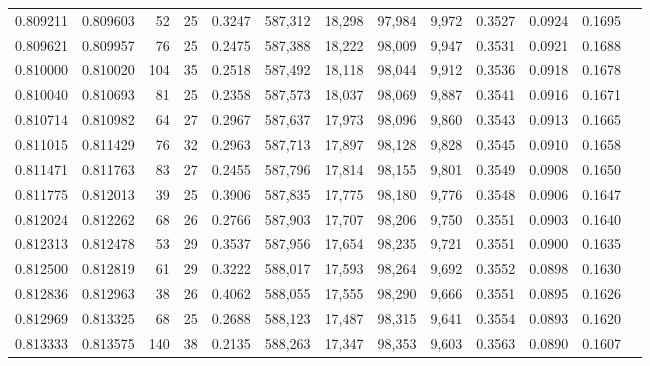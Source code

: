 \begin{tabular}{rrrrrrrrrrrrr}
0.809211 & 0.809603 &     52 &    25 &                                     0.3247 & 587,312 &  18,298 &  97,984 &   9,972 & 0.3527 & 0.0924 & 0.1695 \\
0.809621 & 0.809957 &     76 &    25 &                                     0.2475 & 587,388 &  18,222 &  98,009 &   9,947 & 0.3531 & 0.0921 & 0.1688 \\
0.810000 & 0.810020 &    104 &    35 &                                     0.2518 & 587,492 &  18,118 &  98,044 &   9,912 & 0.3536 & 0.0918 & 0.1678 \\
0.810040 & 0.810693 &     81 &    25 &                                     0.2358 & 587,573 &  18,037 &  98,069 &   9,887 & 0.3541 & 0.0916 & 0.1671 \\
0.810714 & 0.810982 &     64 &    27 &                                     0.2967 & 587,637 &  17,973 &  98,096 &   9,860 & 0.3543 & 0.0913 & 0.1665 \\
0.811015 & 0.811429 &     76 &    32 &                                     0.2963 & 587,713 &  17,897 &  98,128 &   9,828 & 0.3545 & 0.0910 & 0.1658 \\
0.811471 & 0.811763 &     83 &    27 &                                     0.2455 & 587,796 &  17,814 &  98,155 &   9,801 & 0.3549 & 0.0908 & 0.1650 \\
0.811775 & 0.812013 &     39 &    25 &                                     0.3906 & 587,835 &  17,775 &  98,180 &   9,776 & 0.3548 & 0.0906 & 0.1647 \\
0.812024 & 0.812262 &     68 &    26 &                                     0.2766 & 587,903 &  17,707 &  98,206 &   9,750 & 0.3551 & 0.0903 & 0.1640 \\
0.812313 & 0.812478 &     53 &    29 &                                     0.3537 & 587,956 &  17,654 &  98,235 &   9,721 & 0.3551 & 0.0900 & 0.1635 \\
0.812500 & 0.812819 &     61 &    29 &                                     0.3222 & 588,017 &  17,593 &  98,264 &   9,692 & 0.3552 & 0.0898 & 0.1630 \\
0.812836 & 0.812963 &     38 &    26 &                                     0.4062 & 588,055 &  17,555 &  98,290 &   9,666 & 0.3551 & 0.0895 & 0.1626 \\
0.812969 & 0.813325 &     68 &    25 &                                     0.2688 & 588,123 &  17,487 &  98,315 &   9,641 & 0.3554 & 0.0893 & 0.1620 \\
0.813333 & 0.813575 &    140 &    38 &                                     0.2135 & 588,263 &  17,347 &  98,353 &   9,603 & 0.3563 & 0.0890 & 0.1607 \\

\end{tabular}
